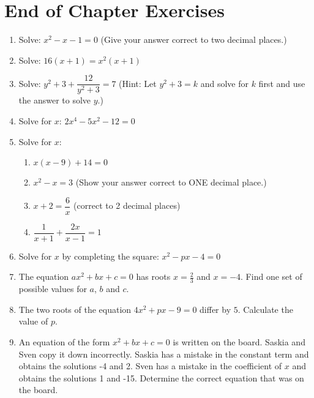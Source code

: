 \section{End of Chapter Exercises}
\begin{enumerate}
\item{Solve: $x^2 - x - 1 = 0$ \quad (Give your answer correct to two decimal places.)}
\item{Solve: $16(x+1) = x^2 (x+1)$}
\item{Solve: $y^2 + 3 + \dfrac{12}{y^2 + 3} = 7$ \quad
(Hint:  Let $y^2+3 = k$ and solve for $k$ first and use the answer to solve $y$.)}
\item{Solve for $x$: $2x^4 - 5x^2 - 12 = 0$}
\item{Solve for $x$:
\begin{enumerate}
\item{$x(x-9)+14 = 0$}
\item{$x^2  - x = 3$ \quad (Show your answer correct to ONE decimal place.)}
\item{$x + 2 = \dfrac{6}{x}$ \quad (correct to 2 decimal places)}
\item{$\dfrac{1}{x+1}+\dfrac{2x}{x-1} = 1$}
\end{enumerate}}
\item{Solve for $x$ by completing the square: $x^2 - px - 4 = 0$}
\item{The equation $ax^2 + bx + c = 0$ has roots $x=\tfrac{2}{3}$ and $x=-4$. Find one set of possible values for $a$, $b$ and $c$.}

\item{The two roots of the equation $4x^2 + px - 9 = 0$ differ by $5$. Calculate the value of $p$.}

\item{ An equation of the form $x^2 + bx + c = 0$ is written
on the board. Saskia and Sven copy it down incorrectly. Saskia has
a mistake in the constant term and obtains the solutions -4 and 2.
Sven has a mistake in the coefficient of $x$ and obtains the solutions
1 and -15. Determine the correct equation that was on the
board.}


\end{enumerate}
